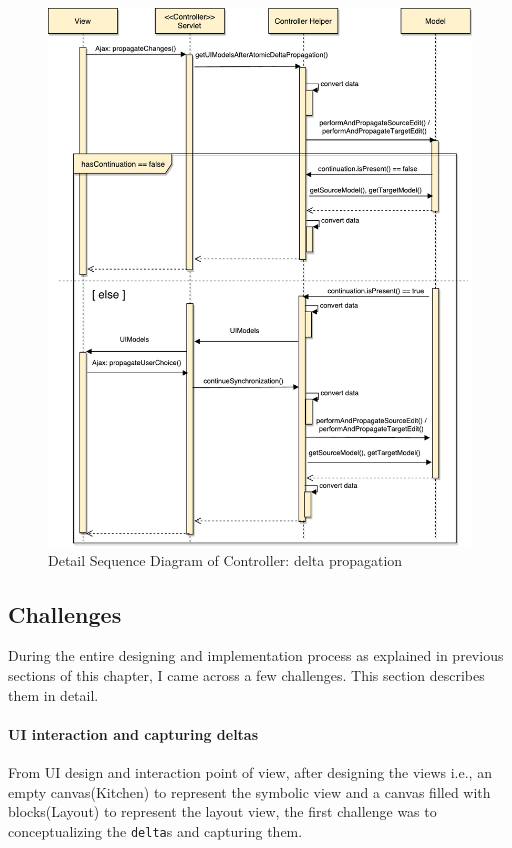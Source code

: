 \begin{figure}
	\includegraphics[width=1\textwidth]{figures/Sequence_Diagram-Controller(delta)}
	\caption{Detail Sequence Diagram of Controller: delta propagation}
	\label{fig:Sequence_Diagram-Controller(delta)}
\end{figure}

\clearpage
\subsection{Challenges}\label{subsec:designchallenges}
During the entire designing and implementation process as explained in previous sections of this chapter, I came across a few challenges. This section describes them in detail. 

\paragraph{UI interaction and capturing deltas}
From UI design and interaction point of view, after designing the views i.e., an empty canvas(Kitchen) to represent the symbolic view and a canvas filled with blocks(Layout) to represent the layout view, the first challenge was to conceptualizing the \texttt{delta}s and capturing them. 

